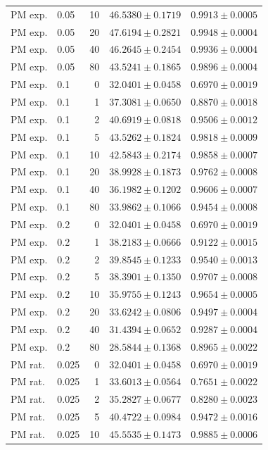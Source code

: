 \begin{longtable}{llrll}
PM exp. & 0.05 & 10 & $46.5380 \pm 0.1719$ & $0.9913 \pm 0.0005$ \\
PM exp. & 0.05 & 20 & $47.6194 \pm 0.2821$ & $0.9948 \pm 0.0004$ \\
PM exp. & 0.05 & 40 & $46.2645 \pm 0.2454$ & $0.9936 \pm 0.0004$ \\
PM exp. & 0.05 & 80 & $43.5241 \pm 0.1865$ & $0.9896 \pm 0.0004$ \\
PM exp. & 0.1 & 0 & $32.0401 \pm 0.0458$ & $0.6970 \pm 0.0019$ \\
PM exp. & 0.1 & 1 & $37.3081 \pm 0.0650$ & $0.8870 \pm 0.0018$ \\
PM exp. & 0.1 & 2 & $40.6919 \pm 0.0818$ & $0.9506 \pm 0.0012$ \\
PM exp. & 0.1 & 5 & $43.5262 \pm 0.1824$ & $0.9818 \pm 0.0009$ \\
PM exp. & 0.1 & 10 & $42.5843 \pm 0.2174$ & $0.9858 \pm 0.0007$ \\
PM exp. & 0.1 & 20 & $38.9928 \pm 0.1873$ & $0.9762 \pm 0.0008$ \\
PM exp. & 0.1 & 40 & $36.1982 \pm 0.1202$ & $0.9606 \pm 0.0007$ \\
PM exp. & 0.1 & 80 & $33.9862 \pm 0.1066$ & $0.9454 \pm 0.0008$ \\
PM exp. & 0.2 & 0 & $32.0401 \pm 0.0458$ & $0.6970 \pm 0.0019$ \\
PM exp. & 0.2 & 1 & $38.2183 \pm 0.0666$ & $0.9122 \pm 0.0015$ \\
PM exp. & 0.2 & 2 & $39.8545 \pm 0.1233$ & $0.9540 \pm 0.0013$ \\
PM exp. & 0.2 & 5 & $38.3901 \pm 0.1350$ & $0.9707 \pm 0.0008$ \\
PM exp. & 0.2 & 10 & $35.9755 \pm 0.1243$ & $0.9654 \pm 0.0005$ \\
PM exp. & 0.2 & 20 & $33.6242 \pm 0.0806$ & $0.9497 \pm 0.0004$ \\
PM exp. & 0.2 & 40 & $31.4394 \pm 0.0652$ & $0.9287 \pm 0.0004$ \\
PM exp. & 0.2 & 80 & $28.5844 \pm 0.1368$ & $0.8965 \pm 0.0022$ \\
PM rat. & 0.025 & 0 & $32.0401 \pm 0.0458$ & $0.6970 \pm 0.0019$ \\
PM rat. & 0.025 & 1 & $33.6013 \pm 0.0564$ & $0.7651 \pm 0.0022$ \\
PM rat. & 0.025 & 2 & $35.2827 \pm 0.0677$ & $0.8280 \pm 0.0023$ \\
PM rat. & 0.025 & 5 & $40.4722 \pm 0.0984$ & $0.9472 \pm 0.0016$ \\
PM rat. & 0.025 & 10 & $45.5535 \pm 0.1473$ & $0.9885 \pm 0.0006$ \\

\end{longtable}
